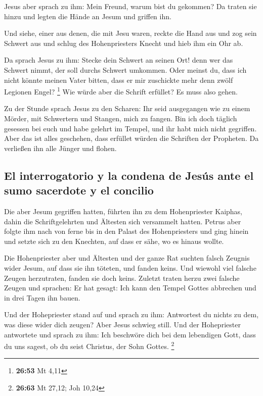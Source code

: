  Jesus aber sprach zu ihm: Mein Freund, warum bist du
gekommen? Da traten sie hinzu und legten die Hände an Jesum und griffen
ihn.

 Und siehe, einer aus denen, die mit Jesu waren, reckte
die Hand aus und zog sein Schwert aus und schlug des Hohenpriesters
Knecht und hieb ihm ein Ohr ab.

 Da sprach Jesus zu ihm: Stecke dein Schwert an seinen
Ort! denn wer das Schwert nimmt, der soll durchs Schwert umkommen.
 Oder meinst du, dass ich nicht könnte meinen Vater
bitten, dass er mir zuschickte mehr denn zwölf Legionen Engel?
\footnote{\textbf{26:53} Mt 4,11}  Wie würde aber die
Schrift erfüllet? Es muss also gehen.

 Zu der Stunde sprach Jesus zu den Scharen: Ihr seid
ausgegangen wie zu einem Mörder, mit Schwertern und Stangen, mich zu
fangen. Bin ich doch täglich gesessen bei euch und habe gelehrt im
Tempel, und ihr habt mich nicht gegriffen.  Aber das ist
alles geschehen, dass erfüllet würden die Schriften der Propheten. Da
verließen ihn alle Jünger und flohen.

\hypertarget{el-interrogatorio-y-la-condena-de-jesuxfas-ante-el-sumo-sacerdote-y-el-concilio}{%
\subsection{El interrogatorio y la condena de Jesús ante el sumo
sacerdote y el
concilio}\label{el-interrogatorio-y-la-condena-de-jesuxfas-ante-el-sumo-sacerdote-y-el-concilio}}

 Die aber Jesum gegriffen hatten, führten ihn zu dem
Hohenpriester Kaiphas, dahin die Schriftgelehrten und Ältesten sich
versammelt hatten.  Petrus aber folgte ihm nach von ferne
bis in den Palast des Hohenpriesters und ging hinein und setzte sich zu
den Knechten, auf dass er sähe, wo es hinaus wollte.

 Die Hohenpriester aber und Ältesten und der ganze Rat
suchten falsch Zeugnis wider Jesum, auf dass sie ihn töteten,
 und fanden keins. Und wiewohl viel falsche Zeugen
herzutraten, fanden sie doch keins. Zuletzt traten herzu zwei falsche
Zeugen  und sprachen: Er hat gesagt: Ich kann den Tempel
Gottes abbrechen und in drei Tagen ihn bauen.

 Und der Hohepriester stand auf und sprach zu ihm:
Antwortest du nichts zu dem, was diese wider dich zeugen?
 Aber Jesus schwieg still. Und der Hohepriester
antwortete und sprach zu ihm: Ich beschwöre dich bei dem lebendigen
Gott, dass du uns sagest, ob du seist Christus, der Sohn Gottes.
\footnote{\textbf{26:63} Mt 27,12; Joh 10,24}

